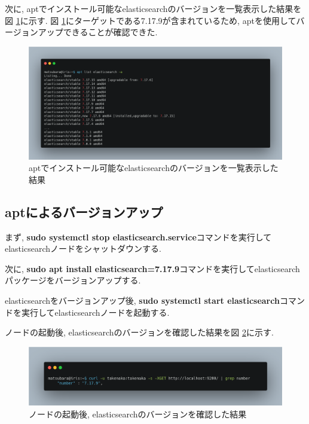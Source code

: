 \documentclass[a4j,12pt,]{jarticle}
\begin{document}
次に, aptでインストール可能なelasticsearchのバージョンを一覧表示した結果を図 \ref{p2}に示す. 図 \ref{p2}にターゲットである7.17.9が含まれているため, aptを使用してバージョンアップできることが確認できた.

\begin{figure}[H]
  \begin{center}
    \includegraphics[width=160mm]{apt-list.png}
    \caption{aptでインストール可能なelasticsearchのバージョンを一覧表示した結果}
    \label{p2}
  \end{center}
\end{figure}

\subsection{aptによるバージョンアップ}

まず, \textbf{sudo systemctl stop elasticsearch.service}コマンドを実行してelasticsearchノードをシャットダウンする.

次に, \textbf{sudo apt install elasticsearch=7.17.9}コマンドを実行してelasticsearchパッケージをバージョンアップする.

elasticsearchをバージョンアップ後, \textbf{sudo systemctl start elasticsearch}コマンドを実行してelasticsearchノードを起動する.

ノードの起動後, elasticsearchのバージョンを確認した結果を図 \ref{p3}に示す.

\begin{figure}[H]
  \begin{center}
    \includegraphics[width=160mm]{version-check.png}
    \caption{ノードの起動後, elasticsearchのバージョンを確認した結果}
    \label{p3}
  \end{center}
\end{figure}
\end{document}
